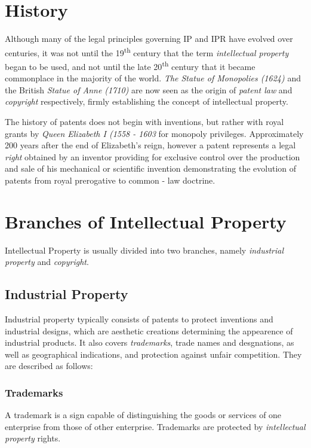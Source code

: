 \documentclass[a4paper,11pt]{article}
\begin{document}
\section{History}
Although many of the legal principles governing IP and IPR have evolved over
centuries, it was not until the 19\textsuperscript{th} century that the term \emph{intellectual
property} began to be used, and not until the late 20\textsuperscript{th}
century that it became commonplace in the majority of the world.\cite{ipweb}
\emph{The Statue of Monopolies (1624)}\cite{statueofmonopolies} and the British
\emph{Statue of Anne (1710)}\cite{statueofanne} are now seen as the origin of
\emph{patent law}\cite{patentlaw} and \emph{copyright}\cite{copyrightlaw}
respectively,\cite{ipweb} firmly establishing the concept of intellectual
property.

The history of patents does not begin with inventions, but rather with royal
grants by \emph{Queen Elizabeth I (1558 - 1603}\cite{queenelizabethi} for monopoly privileges.
Approximately 200 years after the end of Elizabeth's reign, however a
patent represents a legal \emph{right}\cite{legalright} obtained by an inventor
providing for exclusive control over the production and sale of his mechanical
or scientific invention demonstrating the evolution of patents from royal
prerogative to common - law doctrine.

\section{Branches of Intellectual Property}
Intellectual Property is usually divided into two branches, namely
\emph{industrial property} and
\emph{copyright}\cite{copyrightlaw}.

\subsection{Industrial Property}
Industrial property typically consists of patents to protect inventions and
industrial designs, which are aesthetic creations determining the appearence of
industrial products. It also covers \emph{trademarks}\cite{trademarks}, trade names and desgnations, as
well as geographical indications, and protection against unfair competition.
They are described as follows:

\subsubsection{Trademarks}
A trademark is a sign capable of distinguishing the goods or services of one
enterprise from those of other enterprise. Trademarks are protected by
\emph{intellectual property}\cite{ipweb} rights.
\end{document}
